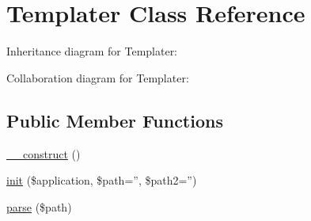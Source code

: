 \hypertarget{classTemplater}{
\section{Templater Class Reference}
\label{classTemplater}
}


Inheritance diagram for Templater:


Collaboration diagram for Templater:
\subsection*{Public Member Functions}
\begin{DoxyCompactItemize}
\item 
\hyperlink{classTemplater_a095c5d389db211932136b53f25f39685}{\_\-\_\-construct} ()
\item 
\hyperlink{classTemplater_a727658f81bc18c6c88995f8aba92c775}{init} (\$application, \$path='', \$path2='')
\item 
\hyperlink{classTemplater_a16cb512b453ef9d52c8632f9ffb2b70f}{parse} (\$path)
\end{DoxyCompactItemize}

